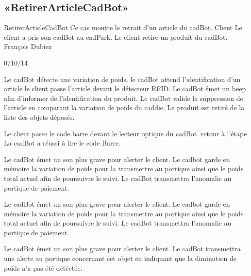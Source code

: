 \subsection{«RetirerArticleCadBot»}

\startCU
\nom RetirerArticleCadBot
\but Ce cas montre le retrait d'un article du cadBot.
\acteur Client
\precondition Le client a pris son cadBot au cadPark.
\declenchement Le client retire un produit du cadBot.
\auteur François Dubiez
\date 30/10/14

\nominal %
\startnominal
\etape Le cadBot détecte une variation de poids.
\etape le cadBot attend l'identification d'un article
 le client passe l'article devant le détecteur RFID.
\etape[RAC:SA1] Le cadBot émet un beep afin d'informer de l'identification du produit.
\etape[RAC:SA3] Le cadBot valide la suppression de l'article en comparant la variation de poids du caddie.
\stopnominal
\postcondition Le produit est retiré de la liste des objets déposés.

\alternatif %
  \etape Le client passe le code barre devant le lecteur optique du cadBot.
  \etape retour à l'étape \in[RAC:SA1]
\stopcondition
\postcondition La cadBot a réussi à lire le code Barre.
\stopalternatif

\exceptions
{}
   \etape Le cadBot émet un son plus grave pour alerter le client.
   \etape Le cadbot garde en mémoire la variation de poids pour la transmettre au portique ainsi que le poids total actuel afin de poursuivre le suivi.
\stopcondition
\postcondition Le cadBot transmettra l'anomalie au portique de paiement.
\stopalternatif

\startalternatif[RAC:SA1]
   \etape Le cadBot émet un son plus grave pour alerter le client.
   \etape Le cadbot garde en mémoire la variation de poids pour la transmettre au portique ainsi que le poids total actuel afin de poursuivre le suivi.
\stopcondition
\postcondition Le cadBot transmettra l'anomalie au portique de paiement.
\stopalternatif

\startalternatif[RAC:SA3]
   \etape Le cadBot émet un son plus grave pour alerter le client.
\stopcondition
\postcondition Le cadBot transmettra une alerte au portique concernant cet objet en indiquant que la diminution de poids n'a pas été détéctée.
\stopalternatif

\stopCU
